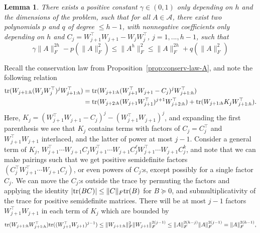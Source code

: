 \documentclass{article}
\makeatletter
\renewenvironment{proof}[1][\proofname]{
  \par\pushQED{\qed}\normalfont
  \topsep6\p@\@plus6\p@\relax
  \trivlist\item[\hskip\labelsep\bfseries#1\@addpunct{.}]
  \ignorespaces
}{
  \popQED\endtrivlist\@endpefalse
}
\newtheorem{lemma}[proposition]{Lemma}
\def\tr{{\rm tr}}
\newcommand{\1}{\mathds{1}}
\makeatother
\begin{document}
\begin{lemma}
    \label{lem:bounded}
    There exists a positive constant $\gamma\in(0,1)$ only depending on $h$ and the dimensions of the problem, such that for all $A\in \mathcal{A}$, there exist two polynomials $p$ and $q$ of degree $\leq h-1$, with nonnegative coefficients only depending on $h$ and $C_j=W_{j+1}^\top  W_{j+1}-W_{j}W_{j}^\top $, $j=1,...,h-1$, such that
\begin{equation}
	\gamma \lVert A \rVert^{2h}_F - p\left(\lVert A \rVert^{2}_F\right) \leq \lVert A^h \rVert^2_F \leq \lVert A \rVert^{2h}_F + q\left(\lVert A \rVert^{2}_F\right)
\end{equation}
\end{lemma}

\begin{proof}
    Recall the conservation law from Proposition~\ref{prop:conserv-law-A}, and note the following relation
\begin{align}
	\tr{(W_{j+1:h}(W_jW_j^\top )^jW_{j+1:h}^\top )} &= \tr{(W_{j+1:h}(W_{j+1}^\top W_{j+1}-C_j)^jW_{j+1:h}^\top )} \nonumber \\
	&= \tr{(W_{j+2:h}(W_{j+1}W_{j+1}^\top )^{j+1}W_{j+2:h}^\top )} + \tr{(W_{j+1:h} K_j W_{j+1:h}^\top )}. \label{eq:tr_split}
\end{align}
Here, $K_j=(W_{j+1}^\top W_{j+1}-C_j)^j-(W_{j+1}^\top W_{j+1})^{j}$, and expanding the first parenthesis we see that $ K_j $ contains terms with factors of $C_j=C_j^\top $ and $W_{j+1}^\top W_{j+1}$ interlaced, and the latter of power at most $j-1$. Consider a general term of $ K_j$, $W_{j+1}^\top \cdots W_{j+1}C_j W_{j+1}^\top \cdots W_{j+1}C_j^\ell W_{j+1}^\top \cdots W_{j+1}C_j^k$, and note that we can make pairings such that we get positive semidefinite factors $(C_j^\top W_{j+1}^\top \cdots W_{j+1}C_j)$, or even powers of $C_j$:s, except possibly for a single factor $C_j$. We can move the $C_j$:s outside the trace by permuting the factors and applying the identity $\lvert \tr{(BC)}\rvert \leq \lVert C\rVert_F\tr{(B)}$ for $B\succeq0$, and submultiplicativity of the trace for positive semidefinite matrices. There will be at most $j-1$ factors $W_{j+1}^\top W_{j+1}$ in each term of $K_j$ which are bounded by 
\begin{equation*}
	\tr{(W_{j+1:h}W_{j+1:h}^\top )}\tr{((W_{j+1}^\top W_{j+1})^{j-1})} \leq \lVert W_{j+1:h}\rVert^{2}_F \lVert W_{j+1}\rVert^{2(j-1)}_F \leq \lVert A \rVert^{2(h-j)}_F\lVert A \rVert^{2(j-1)}_F = \lVert A \rVert^{2(h-1)}_F,
\end{equation*}

\end{proof}
\end{document}

